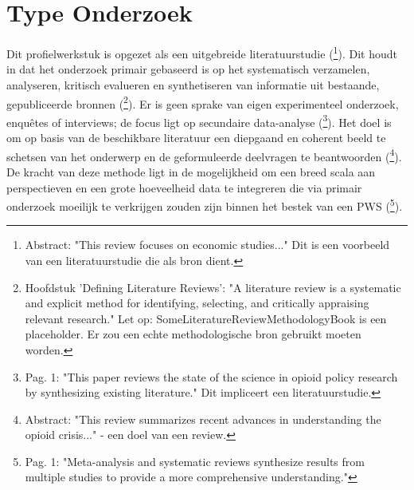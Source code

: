 \documentclass[11pt, a4paper]{report} %
\begin{document}
\section{Type Onderzoek}
Dit profielwerkstuk is opgezet als een uitgebreide literatuurstudie (\cite{Maclean2020EconomicStudiesOpioid}\footnote{Abstract: "This review focuses on economic studies..." Dit is een voorbeeld van een literatuurstudie die als bron dient.}). Dit houdt in dat het onderzoek primair gebaseerd is op het systematisch verzamelen, analyseren, kritisch evalueren en synthetiseren van informatie uit bestaande, gepubliceerde bronnen (\cite{SomeLiteratureReviewMethodologyBook}\footnote{Hoofdstuk 'Defining Literature Reviews': "A literature review is a systematic and explicit method for identifying, selecting, and critically appraising relevant research." Let op: SomeLiteratureReviewMethodologyBook is een placeholder. Er zou een echte methodologische bron gebruikt moeten worden.}). Er is geen sprake van eigen experimenteel onderzoek, enquêtes of interviews; de focus ligt op secundaire data-analyse (\cite{Schuler2020StateScienceOpioidPolicy}\footnote{Pag. 1: "This paper reviews the state of the science in opioid policy research by synthesizing existing literature." Dit impliceert een literatuurstudie.}). Het doel is om op basis van de beschikbare literatuur een diepgaand en coherent beeld te schetsen van het onderwerp en de geformuleerde deelvragen te beantwoorden (\cite{Volkow2021ChangingOpioidCrisis}\footnote{Abstract: "This review summarizes recent advances in understanding the opioid crisis..." - een doel van een review.}). De kracht van deze methode ligt in de mogelijkheid om een breed scala aan perspectieven en een grote hoeveelheid data te integreren die via primair onderzoek moeilijk te verkrijgen zouden zijn binnen het bestek van een PWS (\cite{Gurevitch2018MetaAnalysis}\footnote{Pag. 1: "Meta-analysis and systematic reviews synthesize results from multiple studies to provide a more comprehensive understanding."}).
\end{document}
